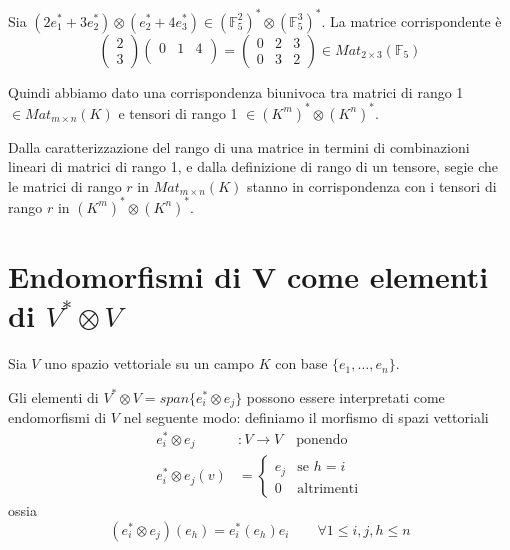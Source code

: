 \documentclass[../main.tex]{subfiles}
\begin{document}
\begin{example}
    Sia $(2 e_1^* + 3 e_2^*) \otimes (e_2^* + 4 e_3^*) \in (\mathbb{F}_5^2)^* \otimes (\mathbb{F}_5^3)^*$. La matrice corrispondente è
    \begin{equation*}
        \begin{pmatrix}
            2 \\
            3
        \end{pmatrix} \begin{pmatrix}
            0 & 1 & 4 \\
        \end{pmatrix} = \begin{pmatrix}
            0 & 2 & 3 \\
            0 & 3 & 2
        \end{pmatrix} \in Mat_{2 \times 3}(\mathbb{F}_5)
    \end{equation*}
\end{example}

Quindi abbiamo dato una corrispondenza biunivoca tra matrici di rango 1 $\in Mat_{m \times n}(K)$ e tensori di rango 1 $\in (K^m)^* \otimes (K^n)^*$.

Dalla caratterizzazione del rango di una matrice in termini di combinazioni lineari di matrici di rango 1, e dalla definizione di rango di un tensore, segie che le matrici di rango $r$ in $Mat_{m \times n}(K)$ stanno in corrispondenza con i tensori di rango $r$ in $(K^m)^* \otimes (K^n)^*$.

\section[Endomorfismi di V come elementi del prodotto tensoriale]{Endomorfismi di V come elementi di $V^* \otimes V$}

Sia $V$ uno spazio vettoriale su un campo $K$ con base $\{e_1,\ldots, e_n\}$.

Gli elementi di $V^* \otimes V = span\{e_i^* \otimes e_j\}$ possono essere interpretati come endomorfismi di $V$ nel seguente modo:
definiamo il morfismo di spazi vettoriali
\begin{align*}
    e_i^* \otimes e_j     & : V \rightarrow V \quad \text{ponendo} \\
    e_i^* \otimes e_j (v) & = \begin{cases}
                                  e_j & \text{se } h = i  \\
                                  0   & \text{altrimenti}
                              \end{cases}
\end{align*}
ossia
\begin{equation*}
    (e_i^* \otimes e_j)(e_h) = e_i^* (e_h) e_i \qquad \forall 1 \leq i,j,h \leq n
\end{equation*}
\end{document}
